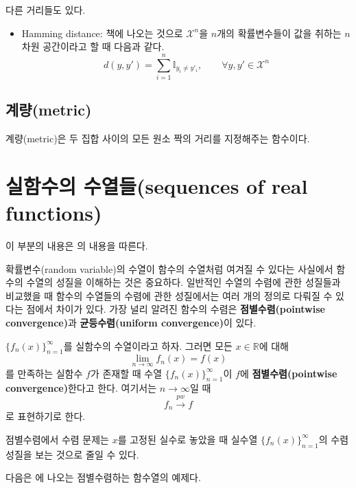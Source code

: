 \documentclass[b5paper,]{scrbook}
\providecommand{\tightlist}{%
  \setlength{\itemsep}{0pt}\setlength{\parskip}{0pt}}
\theoremstyle{plain}
\theoremstyle{definition}
\numberwithin{equation}{section}
\let\BeginKnitrBlock\begin \let\EndKnitrBlock\end
\begin{document}
다른 거리들도 있다.

\begin{itemize}
\tightlist
\item
  Hamming distance: \citep{Massart2007} 책에 나오는 것으로 \(\mathcal{X}^{n}\)을 \(n\)개의 확률변수들이 값을 취하는 \(n\)차원 공간이라고 할 때 다음과 같다.
  \[d(y,y')=\sum_{i=1}^{n}\mathbb{I}_{y_{i}\neq y'_{i}}, \qquad{\forall y,y'\in\mathcal{X}^{n}}\]
\end{itemize}

\hypertarget{metric}{%
\subsection{계량(metric)}\label{metric}}

계량(metric)은 두 집합 사이의 모든 원소 짝의 거리를 지정해주는 함수이다.

\hypertarget{-sequences-of-real-functions}{%
\section{실함수의 수열들(sequences of real functions)}\label{-sequences-of-real-functions}}

이 부분의 내용은 \citep{Polansky2011}의 내용을 따른다.

확률변수(random variable)의 수열이 함수의 수열처럼 여겨질 수 있다는 사실에서 함수의 수열의 성질을 이해하는 것은 중요하다. 일반적인 수열의 수렴에 관한 성질들과 비교했을 때 함수의 수열들의 수렴에 관한 성질에서는 여러 개의 정의로 다뤄질 수 있다는 점에서 차이가 있다. 가장 널리 알려진 함수의 수렴은 \textbf{점별수렴(pointwise convergence)}과 \textbf{균등수렴(uniform convergence)}이 있다.

\BeginKnitrBlock{definition}[점별수렴]
\protect\hypertarget{def:unnamed-chunk-35}{}{\label{def:unnamed-chunk-35} {} }\(\{ f_{n}(x)\}_{n=1}^{\infty}\)를 실함수의 수열이라고 하자. 그러면 모든 \(x\in\mathbb{R}\)에 대해
\[\lim_{n\rightarrow \infty}f_{n}(x)=f(x)\]
를 만족하는 실함수 \(f\)가 존재할 때 수열 \(\{ f_{n}(x)\}_{n=1}^{\infty}\)이 \(f\)에 \textbf{점별수렴(pointwise convergence)}한다고 한다. 여기서는 \(n\rightarrow \infty\)일 때
\[f_{n} \stackrel{pw}{\rightarrow} f\]
로 표현하기로 한다.
\EndKnitrBlock{definition}

점별수렴에서 수렴 문제는 \(x\)를 고정된 실수로 놓았을 때 실수열 \(\{f_{n}(x)\}_{n=1}^{\infty}\)의 수렴 성질을 보는 것으로 줄일 수 있다.

다음은 \citep{Shima2016}에 나오는 점별수렴하는 함수열의 예제다.
\end{document}
